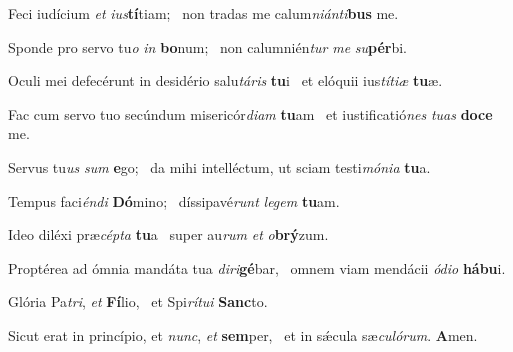 \item Feci iudícium \textit{et} \textit{ius}\textbf{tí}tiam;~\psstar{} non tradas me calum\textit{niánti}\textbf{bus} me.

\item Sponde pro servo tu\textit{o} \textit{in} \textbf{bo}num;~\psstar{} non calumnién\textit{tur} \textit{me} \textit{su}\textbf{pér}bi.

\item Oculi mei defecérunt in desidério salu\textit{táris} \textbf{tu}i~\psstar{} et elóquii ius\textit{títiæ} \textbf{tu}æ.

\item Fac cum servo tuo secúndum misericór\textit{diam} \textbf{tu}am~\psstar{} et iustificatió\textit{nes} \textit{tuas} \textbf{do}\textbf{ce} me.

\item Servus tu\textit{us} \textit{sum} \textbf{e}go;~\psstar{} da mihi intelléctum, ut sciam testi\textit{mónia} \textbf{tu}a.

\item Tempus faci\textit{éndi} \textbf{Dó}mino;~\psstar{} díssipavé\textit{runt} \textit{legem} \textbf{tu}am.

\item Ideo diléxi præ\textit{cépta} \textbf{tu}a~\psstar{} super au\textit{rum} \textit{et} \textit{o}\textbf{brý}zum.

\item Proptérea ad ómnia mandáta tua \textit{diri}\textbf{gé}bar,~\psstar{} omnem viam mendácii \textit{ódio} \textbf{há}\textbf{bu}i.

\item Glória Pa\textit{tri}, \textit{et} \textbf{Fí}lio,~\psstar{} et Spi\textit{rítui} \textbf{Sanc}to.

\item Sicut erat in princípio, et \textit{nunc}, \textit{et} \textbf{sem}per,~\psstar{} et in sǽcula sæ\textit{culórum}. \textbf{A}men.
